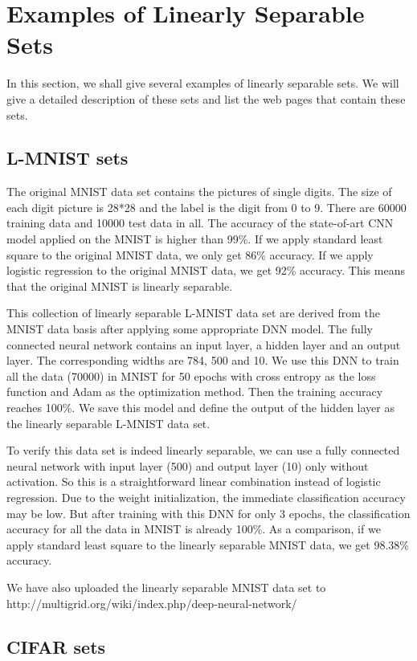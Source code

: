 \section{Examples of Linearly Separable Sets}
In this section, we shall give several examples of linearly separable sets.  We will give a detailed description of these sets and list the web pages that contain these sets. 

\subsection{L-MNIST sets}
The original MNIST data set contains the pictures of single digits. The size of each digit picture is 28*28 and the label is the digit from 0 to 9. There are 60000 training data and 10000 test data in all. The accuracy of the state-of-art CNN model applied on the MNIST is higher than 99\%. If we apply standard least square to the original MNIST data, we only get 86\% accuracy. If we apply logistic regression to the original MNIST data, we get 92\% accuracy. This means that the original MNIST is linearly separable. 

This collection of linearly separable L-MNIST data set are derived from the MNIST data basis after applying some appropriate DNN model. The fully connected neural network contains an input layer, a hidden layer and an output layer. The corresponding widths are 784, 500 and 10. We use this DNN to train all the data (70000) in MNIST for 50 epochs with cross entropy as the loss function and Adam as the optimization method. Then the training accuracy reaches 100\%. We save this model and define the output of the hidden layer as the linearly separable L-MNIST data set. 

To verify this data set is indeed linearly separable, we can use a fully connected neural network with input layer (500) and output layer (10) only without activation. So this is a straightforward linear combination instead of  logistic regression. Due to the weight initialization, the immediate classification accuracy may be low. But after training with this DNN for only 3 epochs, the classification accuracy for all the data in MNIST is already 100\%.  As a comparison, if we apply standard least square to the linearly separable MNIST data, we get 98.38\% accuracy.

We have also uploaded the linearly separable MNIST data set to \\
http://multigrid.org/wiki/index.php/deep-neural-network/
\subsection{CIFAR sets}
